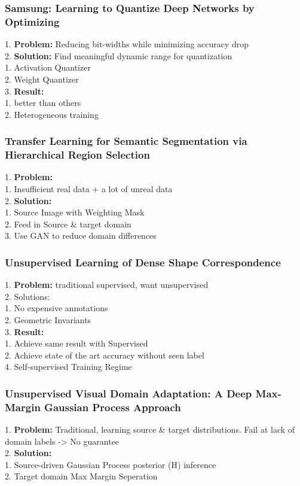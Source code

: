 \subsubsection{Samsung: Learning to Quantize Deep Networks by Optimizing}
    1. {\bf Problem:} Reducing bit-widths while minimizing accuracy drop \\
    2. {\bf Solution:} Find meaningful dynamic range for quantization \\
        1. Activation Quantizer \\
        2. Weight Quantizer \\
    3. {\bf Result:}  \\
        1. better than others \\
        2. Heterogeneous training \\
\subsubsection{Transfer Learning for Semantic Segmentation via Hierarchical Region Selection}
    1. {\bf Problem:} \\
        1. Insufficient real data + a lot of unreal data \\
    2. {\bf Solution:} \\
        1. Source Image with Weighting Mask \\
        2. Feed in Source \& target domain \\
        3. Use GAN to reduce domain differences \\
\subsubsection{Unsupervised Learning of Dense Shape Correspondence}
    1. {\bf Problem:} traditional supervised, want unsupervised \\
    2. Solutions: \\
        1. No expensive annotations \\
        2. Geometric Invariants \\
    3. {\bf Result:} \\
        1. Achieve same result with Supervised \\
        2. Achieve state of the art accuracy without seen label \\
    4. Self-supervised Training Regime \\
\subsubsection{Unsupervised Visual Domain Adaptation: A Deep Max-Margin Gaussian Process Approach}
    1. {\bf Problem:} Traditional, learning source \& target distributions. Fail at lack of domain labels -> No guarantee \\
    2. {\bf Solution:} \\
        1. Source-driven Gaussian Process posterior (H) inference \\
        2. Target domain Max Margin Seperation \\
